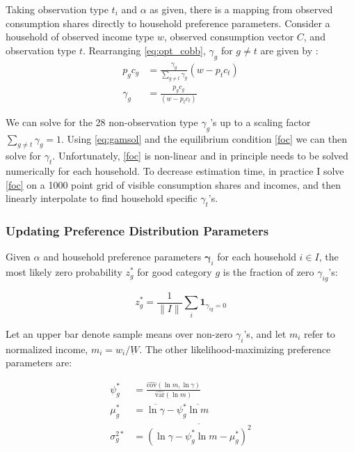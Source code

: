 \documentclass[11pt]{article}
\begin{document}
\begin{CJK}{UTF8}{gbsn}
Taking observation type $t_i$ and $\alpha$ as given, there is a mapping from observed consumption shares directly to household preference parameters.  Consider a household of observed income type $w$, observed consumption vector $C$, and observation type $t$.  Rearranging \eqref{eq:opt_cobb}, $\gamma_g$ for $g\neq t$ are given by :
\begin{align}
	p_gc_g &= \frac{\gamma_g}{\sum_{g\neq t}\gamma_g}  \left(w-  p_t c_t\right) \nonumber \\
	\label{eq:gamsol}
	\gamma_g &= \frac{p_g c_g}{\left(w- p_t c_t\right)} 
\end{align}

We can solve for the 28 non-observation type $\gamma_g$'s up to a scaling factor $\sum_{g\neq t}\gamma_g = 1$.  Using \eqref{eq:gamsol} and the equilibrium condition \eqref{foc} we can then solve for $\gamma_t$.  Unfortunately, \eqref{foc} is non-linear and in principle needs to be solved numerically for each household.  To decrease estimation time, in practice I solve \eqref{foc} on a 1000 point grid of visible consumption shares and incomes, and then linearly interpolate to find household specific $\gamma_t$'s.

\subsubsection{Updating Preference Distribution Parameters}

Given $\alpha$ and household preference parameters $\boldsymbol{\gamma}_i$ for each household $i \in I$, the most likely zero probability $z_g^*$ for good category $g$ is the fraction of zero $\gamma_{ig}$'s:

\begin{equation}
    z_g^* = \frac{1}{\|I\|} \sum_{i} \mathbf{1}_{\gamma_{ig} = 0} \nonumber
\end{equation}

Let an upper bar denote sample means over non-zero $\gamma_i$'s, and let $m_i$ refer to normalized income, $m_i = w_i/\underbar{W}$.  The other likelihood-maximizing preference parameters are:

\begin{align}
    \psi_g^* &= \frac{\hat{\mbox{cov}}(\ln m, \ln \gamma)}{\hat{\mbox{var}}(\ln m)} \nonumber \\
    \mu_g^* &= \overline{\ln \gamma} - \psi_g^* \overline{\ln m} \nonumber \\
    \sigma_g^{2*} &= \overline{\left(\ln \gamma - \psi_g^* \ln m - \mu_g^*\right)^2}
\end{align}


\end{CJK}
\end{document}
